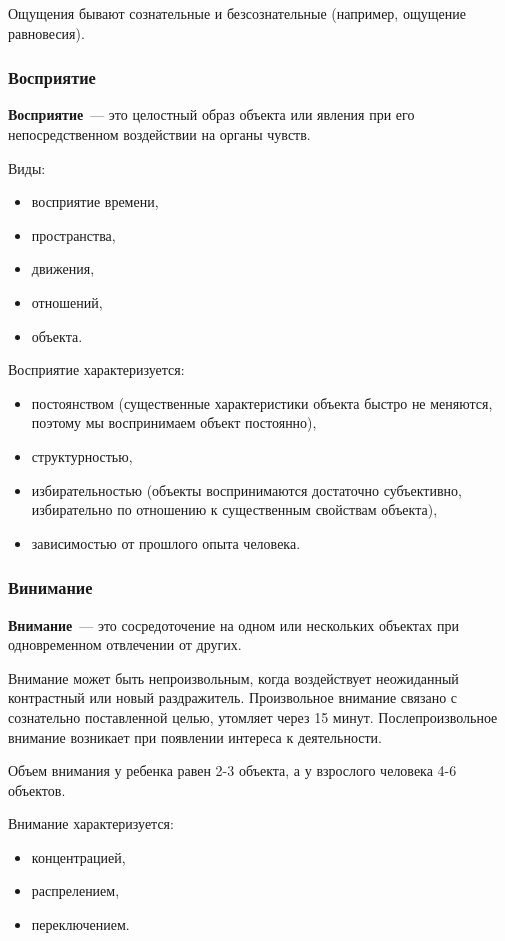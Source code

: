 Ощущения бывают сознательные и безсознательные (например, ощущение равновесия).

\subsubsection{Восприятие}
\textbf{Восприятие}~--- это целостный образ объекта или явления при его непосредственном воздействии на органы чувств.

Виды:
\begin{itemize}
	\item восприятие времени,
	\item пространства,
	\item движения,
	\item отношений,
	\item объекта.
\end{itemize}

Восприятие характеризуется:
\begin{itemize}
	\item постоянством (существенные характеристики объекта быстро не меняются, поэтому мы воспринимаем объект постоянно),
	\item структурностью,
	\item избирательностью (объекты воспринимаются достаточно субъективно, избирательно по отношению к существенным свойствам объекта),
	\item зависимостью от прошлого опыта человека.
\end{itemize}

\subsubsection{Винимание}
\textbf{Внимание}~--- это сосредоточение на одном или нескольких объектах при одновременном отвлечении от других.

Внимание может быть непроизвольным, когда воздействует неожиданный контрастный или новый раздражитель. Произвольное внимание связано с сознательно поставленной целью, утомляет через 15 минут. Послепроизвольное внимание возникает при появлении интереса к деятельности.

Объем внимания у ребенка равен 2-3 объекта, а у взрослого человека 4-6 объектов.

Внимание характеризуется:
\begin{itemize}
	\item концентрацией,
	\item распрелением,
	\item переключением.
\end{itemize}

